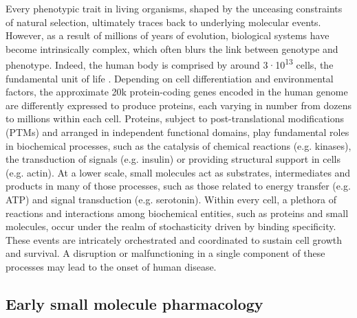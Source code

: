 Every phenotypic trait in living organisms, shaped by the unceasing constraints of natural selection, ultimately traces back to underlying molecular events. However, as a result of millions of years of evolution, biological systems have become intrinsically complex, which often blurs the link between genotype and phenotype. Indeed, the human body is comprised by around 3·10\textsuperscript{13} cells, the fundamental unit of life \cite{hatton_human_2023, sender_revised_2016, bianconi_estimation_2013}. Depending on cell differentiation and environmental factors, the approximate 20k protein-coding genes encoded in the human genome are differently expressed to produce proteins, each varying in number from dozens to millions within each cell\cite{pertea_between_2010, beck_quantitative_2011, ezkurdia_multiple_2014, international_human_genome_sequencing_consortium_finishing_2004, ezkurdia_most_2015}. Proteins, subject to post-translational modifications (PTMs) and arranged in independent functional domains, play fundamental roles in biochemical processes, such as the catalysis of chemical reactions (e.g. kinases), the transduction of signals (e.g. insulin) or providing structural support in cells (e.g. actin)\cite{khoury_proteome-wide_2011, walsh_protein_2005}. At a lower scale, small molecules act as substrates, intermediates and products in many of those processes, such as those related to energy transfer (e.g. ATP) and signal transduction (e.g. serotonin). Within every cell, a plethora of reactions and interactions among biochemical entities, such as proteins and small molecules, occur under the realm of stochasticity driven by binding specificity. These events are intricately orchestrated and coordinated to sustain cell growth and survival. A disruption or malfunctioning in a single component of these processes may lead to the onset of human disease.

\subsection{Early small molecule pharmacology}
\label{Introduction_early}

